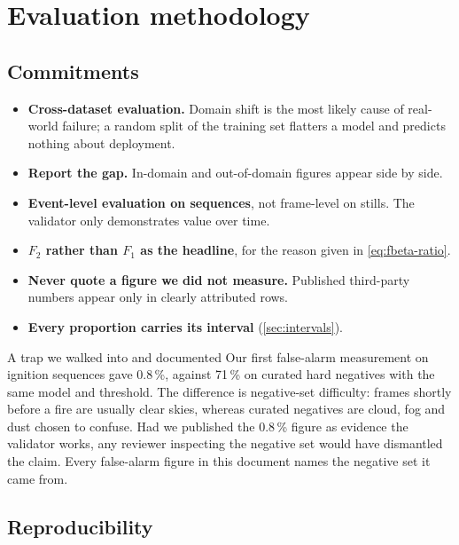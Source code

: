 \section{Evaluation methodology}
\label{sec:methodology}

\subsection{Commitments}

\begin{itemize}
  \item \textbf{Cross-dataset evaluation.} Domain shift is the most likely
        cause of real-world failure; a random split of the training set
        flatters a model and predicts nothing about deployment.
  \item \textbf{Report the gap.} In-domain and out-of-domain figures appear
        side by side.
  \item \textbf{Event-level evaluation on sequences}, not frame-level on
        stills. The validator only demonstrates value over time.
  \item \textbf{$F_2$ rather than $F_1$ as the headline}, for the reason given
        in \cref{eq:fbeta-ratio}.
  \item \textbf{Never quote a figure we did not measure.} Published
        third-party numbers appear only in clearly attributed rows.
  \item \textbf{Every proportion carries its interval} (\cref{sec:intervals}).
\end{itemize}

\begin{recorded}{A trap we walked into and documented}
Our first false-alarm measurement on ignition sequences gave 0.8\,\%, against
71\,\% on curated hard negatives with the same model and threshold. The
difference is negative-set difficulty: frames shortly before a fire are
usually clear skies, whereas curated negatives are cloud, fog and dust chosen
to confuse. Had we published the 0.8\,\% figure as evidence the validator
works, any reviewer inspecting the negative set would have dismantled the
claim. Every false-alarm figure in this document names the negative set it
came from.
\end{recorded}

\subsection{Reproducibility}

